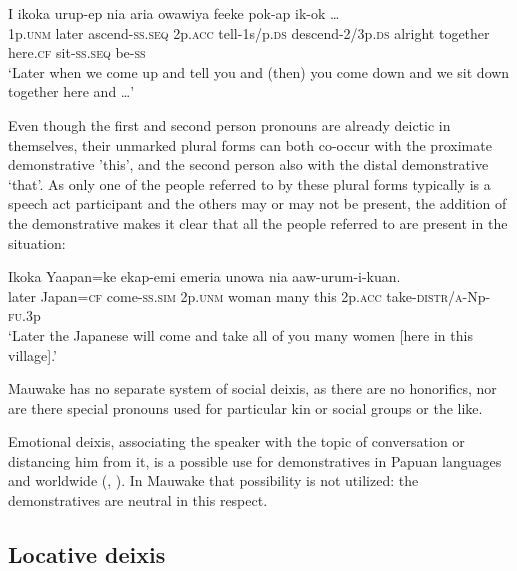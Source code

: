\ea%
\label{ex:6:x1263}
\gll I  ikoka  urup-ep  nia     aria  owawiya  feeke  pok-ap  ik-ok  {\dots}\\
1p.\textsc{unm}  later  ascend-\textsc{ss}.\textsc{seq}  2p.\textsc{acc}  tell-1s/p.\textsc{ds} descend-2/3p.\textsc{ds}  alright  together  here.\textsc{cf}  sit-\textsc{ss}.\textsc{seq}  be-\textsc{ss}\\
\glt `Later when we come up and tell you and (then) you come down and we sit down together here and {\dots}'
\z

Even though the first and second person pronouns are already deictic in themselves, their unmarked plural forms can both co-occur with the proximate demonstrative  'this', 
and the second person also with the distal demonstrative  `that'. As only one of the people referred to by these plural forms typically is a speech act participant and the others may or may not be present, the addition of the demonstrative  makes it clear that all the people referred to are present in the situation: 

\ea%
\label{ex:6:x1269}
\gll Ikoka  Yaapan=ke  ekap-emi    emeria  unowa   nia  aaw-urum-i-kuan.\\
later  Japan=\textsc{cf}  come-\textsc{ss}.\textsc{sim}  2p.\textsc{unm}  woman  many  this 2p.\textsc{acc}  take-\textsc{distr}/\textsc{a}-Np-\textsc{fu}.3p\\
\glt `Later the Japanese will come and take all of you many women [here in this village].'
\z

Mauwake has no separate system of social deixis, as there are no honorifics, nor are there special pronouns used for particular kin or social groups or the like.

Emotional deixis, associating the speaker with the topic of conversation or distancing him from it, is a possible use for demonstratives in Papuan languages and worldwide (\citealt[72--78]{FarrEtAl1982}, \citealt[347--355]{Lakoff1974}). In Mauwake that possibility is not utilized: the demonstratives are neutral in this respect.

\subsection{Locative deixis} \label{sec:6.3.2}

